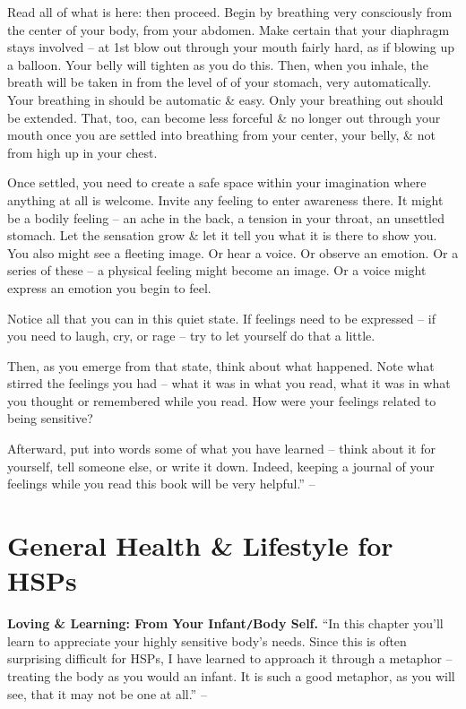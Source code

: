 \documentclass{article}
\numberwithin{equation}{section}
\begin{document}
Read all of what is here: then proceed. Begin by breathing very consciously from the center of your body, from your abdomen. Make certain that your diaphragm stays involved -- at 1st blow out through your mouth fairly hard, as if blowing up a balloon. Your belly will tighten as you do this. Then, when you inhale, the breath will be taken in from the level of of your stomach, very automatically. Your breathing in should be automatic \& easy. Only your breathing out should be extended. That, too, can become less forceful \& no longer out through your mouth once you are settled into breathing from your center, your belly, \& not from high up in your chest.

Once settled, you need to create a safe space within your imagination where anything at all is welcome. Invite any feeling to enter awareness there. It might be a bodily feeling -- an ache in the back, a tension in your throat, an unsettled stomach. Let the sensation grow \& let it tell you what it is there to show you. You also might see a fleeting image. Or hear a voice. Or observe an emotion. Or a series of these -- a physical feeling might become an image. Or a voice might express an emotion you begin to feel.

Notice all that you can in this quiet state. If feelings need to be expressed -- if you need to laugh, cry, or rage -- try to let yourself do that a little.

Then, as you emerge from that state, think about what happened. Note what stirred the feelings you had -- what it was in what you read, what it was in what you thought or remembered while you read. How were your feelings related to being sensitive?

Afterward, put into words some of what you have learned -- think about it for yourself, tell someone else, or write it down. Indeed, keeping a journal of your feelings while you read this book will be very helpful.'' -- \cite[pp. 72--73]{Aron2013}


\section{General Health \& Lifestyle for HSPs}
\textbf{Loving \& Learning: From Your Infant{\tt/}Body Self.} ``In this chapter you'll learn to appreciate your highly sensitive body's needs. Since this is often surprising difficult for HSPs, I have learned to approach it through a metaphor -- treating the body as you would an infant. It is such a good metaphor, as you will see, that it may not be one at all.'' -- \cite[p. 74]{Aron2013}
\end{document}
